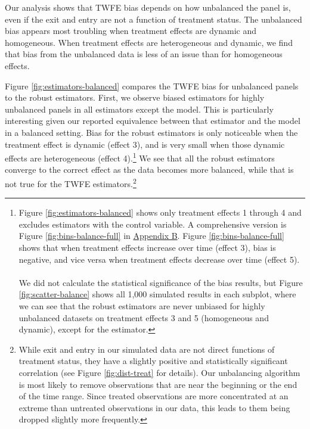 \documentclass[12pt]{article}
\begin{document}
\noindent
Our analysis shows that TWFE bias depends on how unbalanced the panel is, even if the exit and entry are not a function of treatment status. The unbalanced bias appears most troubling when treatment effects are dynamic and homogeneous. When treatment effects are heterogeneous and dynamic, we find that bias from the unbalanced data is less of an issue than for homogeneous effects.

Figure \ref{fig:estimators-balanced} compares the TWFE bias for unbalanced panels to the robust estimators. First, we observe biased estimators for highly unbalanced panels in all estimators except the \citet{sunabr2021a} model. This is particularly interesting given our reported equivalence between that estimator and the \citet{CS2021} model in a balanced setting. Bias for the robust estimators is only noticeable when the treatment effect is dynamic (effect 3), and is very small when those dynamic effects are heterogeneous (effect 4).\footnote{Figure \ref{fig:estimators-balanced} shows only treatment effects 1 through 4 and excludes estimators with the control variable. A comprehensive version is Figure \ref{fig:bins-balance-full} in \hyperref[sec:appendixb]{Appendix B}. Figure \ref{fig:bins-balance-full} shows that when treatment effects increase over time (effect 3), bias is negative, and vice versa when treatment effects decrease over time (effect 5).
\\\\
We did not calculate the statistical significance of the bias results, but Figure \ref{fig:scatter-balance} shows all 1,000 simulated results in each subplot, where we can see that the robust estimators are never unbiased for highly unbalanced datasets on treatment effects 3 and 5 (homogeneous and dynamic), except for the \citet{sunabr2021a} estimator.} We see that all the robust estimators converge to the correct effect as the data becomes more balanced, while that is not true for the TWFE estimators.\footnote{While exit and entry in our simulated data are not direct functions of treatment status, they have a slightly positive and statistically significant correlation (see Figure \ref{fig:dist-treat} for details). Our unbalancing algorithm is most likely to remove observations that are near the beginning or the end of the time range. Since treated observations are more concentrated at an extreme than untreated observations in our data, this leads to them being dropped slightly more frequently.}
\end{document}
